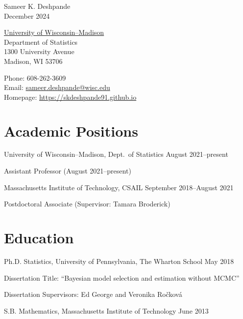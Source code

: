 \documentclass[10pt]{article}
\renewenvironment{itemize}{
  \begin{list}{}{
    \setlength{\leftmargin}{1.5em}
  }
}{
  \end{list}
}
\begin{document}
\begin{center}
{ \Large Sameer K. Deshpande } \\
December 2024
\end{center}

\begin{minipage}{0.4\linewidth}
  \href{http://www.wisc.edu}{University of Wisconsin--Madison} \\
  Department of Statistics \\
  1300 University Avenue \\
  Madison, WI 53706
\end{minipage}
\hfill
\begin{minipage}{0.42\linewidth}
Phone: 608-262-3609 \\
Email: \url{sameer.deshpande@wisc.edu} \\
Homepage: \url{https://skdeshpande91.github.io}
\end{minipage}

\section*{Academic Positions}
\begin{itemize}
\item{University of Wisconsin--Madison, Dept.\ of Statistics \hfill August 2021--present}
\begin{itemize}
\item{Assistant Professor (August 2021--present)}
\end{itemize}
\item{Massachusetts Institute of Technology, CSAIL \hfill September 2018--August 2021}
\begin{itemize}
\item{Postdoctoral Associate (Supervisor: Tamara Broderick)}
\end{itemize}
\end{itemize}

\section*{Education}
\begin{itemize}
\item{Ph.D. Statistics, University of Pennsylvania, The Wharton School \hfill May 2018}
\begin{itemize}
\item{Dissertation Title: ``Bayesian model selection and estimation without MCMC''}
\item{Dissertation Supervisors: Ed George and Veronika Ro\v{c}kov\'{a}}
\end{itemize}
\item{S.B. Mathematics, Massachusetts Institute of Technology \hfill June 2013}
\end{itemize}
\end{document}
